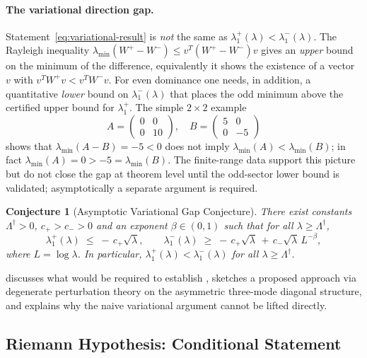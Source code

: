 \documentclass[11pt,a4paper]{article}
\theoremstyle{remark}
\theoremstyle{plain}
\newtheorem{conjecture}[conjecture]{Conjecture}
\begin{document}
\paragraph{The variational direction gap.}
Statement~\eqref{eq:variational-result} is \emph{not} the same as
$\lambda_1^+(\lambda)<\lambda_1^-(\lambda)$. The Rayleigh inequality
$\lambda_{\min}(W^+-W^-)\leq v^T(W^+-W^-)v$ gives an \emph{upper} bound on the
minimum of the difference, equivalently it shows the existence of a vector $v$
with $v^TW^+v<v^TW^-v$. For even dominance one needs, in addition, a
quantitative \emph{lower} bound on $\lambda_1^-(\lambda)$ that places the odd
minimum above the certified upper bound for $\lambda_1^+$. The simple
$2\times2$ example
\[
  A=\begin{pmatrix}0&0\\0&10\end{pmatrix},\quad
  B=\begin{pmatrix}5&0\\0&-5\end{pmatrix}
\]
shows that $\lambda_{\min}(A-B)=-5<0$ does not imply
$\lambda_{\min}(A)<\lambda_{\min}(B)$; in fact $\lambda_{\min}(A)=0>-5=\lambda_{\min}(B)$.
The finite-range data support this picture but do not close the gap at
theorem level until the odd-sector lower bound is validated; asymptotically a
separate argument is required.

\begin{conjecture}[Asymptotic Variational Gap Conjecture]
\label{conj:avg}
There exist constants $\Lambda^\dagger>0$, $c_+>c_->0$ and an exponent
$\beta\in(0,1)$ such that for all $\lambda\geq\Lambda^\dagger$,
\[
  \lambda_1^+(\lambda) \;\leq\; -\,c_+\sqrt\lambda,
  \qquad
  \lambda_1^-(\lambda) \;\geq\; -\,c_+\sqrt\lambda \,+\, c_-\sqrt\lambda\,L^{-\beta},
\]
where $L=\log\lambda$. In particular, $\lambda_1^+(\lambda)<\lambda_1^-(\lambda)$
for all $\lambda\geq\Lambda^\dagger$.
\end{conjecture}

 discusses what would be required to establish
, sketches a proposed approach via degenerate perturbation
theory on the asymmetric three-mode diagonal structure, and explains why the
naive variational argument cannot be lifted directly.

\subsection{Riemann Hypothesis: Conditional Statement}
\end{document}

